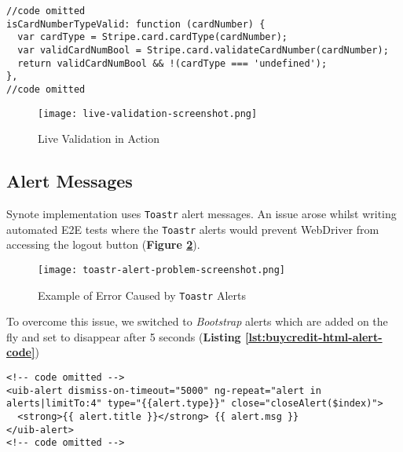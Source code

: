 \begin{listing}[H]
\begin{verbatim}
//code omitted
isCardNumberTypeValid: function (cardNumber) {
  var cardType = Stripe.card.cardType(cardNumber);
  var validCardNumBool = Stripe.card.validateCardNumber(cardNumber);
  return validCardNumBool && !(cardType === 'undefined');
},
//code omitted
\end{verbatim}
\label{lst:payment-service-checkcardnumber-method}
\end{listing}

\begin{figure}[!hbt]
  \centering
 	\texttt{[image: live-validation-screenshot.png]}
  \caption{Live Validation in Action}
 	\label{fig:live-validation-screenshot}
\end{figure}

\subsection{Alert Messages}
\label{subsec:alert-messages}

Synote implementation uses \texttt{Toastr} alert messages. An issue arose whilst writing automated E2E tests where the \texttt{Toastr} alerts would prevent WebDriver from accessing the logout button (\textbf{Figure \ref{fig:toastr-alert-problem-screenshot}}).\\

\begin{figure}[!hbt]
  \centering
 	\texttt{[image: toastr-alert-problem-screenshot.png]}
  \caption{Example of Error Caused by \texttt{Toastr} Alerts}
 	\label{fig:toastr-alert-problem-screenshot}
\end{figure}

To overcome this issue, we switched to \textit{Bootstrap} alerts which are added on the fly and set to disappear after 5 seconds (\textbf{Listing \ref{lst:buycredit-html-alert-code}})\\

\begin{listing}[H]
\begin{verbatim}
<!-- code omitted -->
<uib-alert dismiss-on-timeout="5000" ng-repeat="alert in alerts|limitTo:4" type="{{alert.type}}" close="closeAlert($index)">
  <strong>{{ alert.title }}</strong> {{ alert.msg }}
</uib-alert>
<!-- code omitted -->
\end{verbatim}
\label{lst:buycredit-html-alert-code}
\end{listing}

